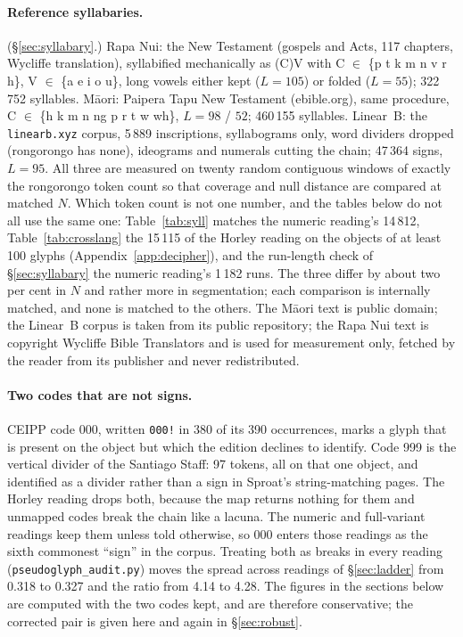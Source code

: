 \documentclass[11pt,a4paper]{article}
\begin{document}
\paragraph{Reference syllabaries.} (\S\ref{sec:syllabary}.) Rapa Nui: the New Testament (gospels and Acts, 117 chapters, Wycliffe translation), syllabified mechanically as (C)V with C $\in$ \{p t k \textquotesingle{} m n \ng{} v r h\}, V $\in$ \{a e i o u\}, long vowels either kept ($L=105$) or folded ($L=55$); 322\,752 syllables. M\=aori: Paipera Tapu New Testament (ebible.org), same procedure, C $\in$ \{h k m n ng p r t w wh\}, $L=98$ / $52$; 460\,155 syllables. Linear~B: the \texttt{linearb.xyz} corpus, 5\,889 inscriptions, syllabograms only, word dividers dropped (rongorongo has none), ideograms and numerals cutting the chain; 47\,364 signs, $L=95$. All three are measured on twenty random contiguous windows of exactly the rongorongo token count so that coverage and null distance are compared at matched $N$. Which token count is not one number, and the tables below do not all use the same one: Table~\ref{tab:syll} matches the numeric reading's 14\,812, Table~\ref{tab:crosslang} the 15\,115 of the Horley reading on the objects of at least 100 glyphs (Appendix~\ref{app:decipher}), and the run-length check of \S\ref{sec:syllabary} the numeric reading's 1\,182 runs. The three differ by about two per cent in $N$ and rather more in segmentation; each comparison is internally matched, and none is matched to the others. The M\=aori text is public domain; the Linear~B corpus is taken from its public repository; the Rapa Nui text is copyright Wycliffe Bible Translators and is used for measurement only, fetched by the reader from its publisher and never redistributed.

\paragraph{Two codes that are not signs.} CEIPP code 000, written \texttt{000!} in 380 of its 390 occurrences, marks a glyph that is present on the object but which the edition declines to identify. Code 999 is the vertical divider of the Santiago Staff: 97 tokens, all on that one object, and identified as a divider rather than a sign in Sproat's string-matching pages. The Horley reading drops both, because the map returns nothing for them and unmapped codes break the chain like a lacuna. The numeric and full-variant readings keep them unless told otherwise, so 000 enters those readings as the sixth commonest ``sign'' in the corpus. Treating both as breaks in every reading (\texttt{pseudoglyph\_audit.py}) moves the spread across readings of \S\ref{sec:ladder} from 0.318 to 0.327 and the ratio from 4.14 to 4.28. The figures in the sections below are computed with the two codes kept, and are therefore conservative; the corrected pair is given here and again in \S\ref{sec:robust}.
\end{document}
